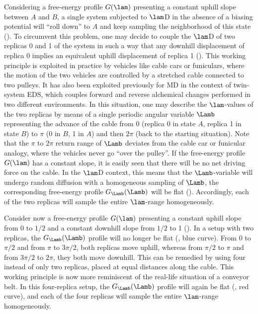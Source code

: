 Considering a free-energy profile $G(\lam)$ presenting a constant uphill slope between $A$ and $B$, a single system subjected to $\lam$D in the absence of a biasing potential will ``roll down'' to $A$ and keep sampling the neighborhood of this state (). To circumvent this problem, one may decide to couple the $\lam$D of two replicas 0 and 1 of the system in such a way that any downhill displacement of replica 0 implies an equivalent uphill displacement of replica 1 (). This working principle is exploited in practice by vehicles like cable cars or funiculars, where the motion of the two vehicles are controlled by a stretched cable connected to two pulleys. It has also been exploited previously for MD in the context of twin-system\cite{HA13.1,GE16.1} EDS, which couples forward and reverse alchemical changes performed in two different environments. In this situation, one may describe the $\lam$-values of the two replicas by means of a single periodic angular variable $\Lamb$ representing the advance of the cable from 0 (replica 0 in state $A$, replica 1 in state $B$) to $\pi$ (0 in $B$, 1 in $A$) and then $2\pi$ (back to the starting situation). Note that the $\pi$ to $2\pi$ return range of $\Lamb$ deviates from the cable car or funicular analogy, where the vehicles never go ``over the pulley''. If the free-energy profile $G(\lam)$ has a constant slope, it is easily seen that there will be no net driving force on the cable. In the $\lam$D context, this means that the $\Lamb$-variable will undergo random diffusion with a homogeneous sampling of $\Lamb$, \ie{} the corresponding free-energy profile $G_{\Lamb}(\Lamb)$ will be flat (). Accordingly, each of the two replicas will sample the entire $\lam$-range homogeneously.


Consider now a free-energy profile $G(\lam)$ presenting a constant uphill slope from 0 to $1/2$ and a constant downhill slope from $1/2$ to 1 (). In a setup with two replicas, the $G_{\Lamb}(\Lamb)$ profile will no longer be flat (, blue curve). From 0 to $\pi/2$ and from $\pi$ to $3\pi/2$, both replicas move uphill, whereas from $\pi/2$ to $\pi$ and from $3\pi/2$ to $2\pi$, they both move downhill. This can be remedied by using four instead of only two replicas, placed at equal distances along the cable. This working principle is now more reminiscent of the real-life situation of a conveyor belt. In this four-replica setup, the $G_{\Lamb}(\Lamb)$ profile will again be flat (, red curve), and each of the four replicas will sample the entire $\lam$-range homogeneously.


